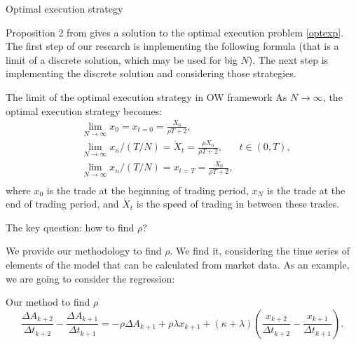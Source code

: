 \documentclass[]{beamer}
\begin{document}
\begin{frame}[t]
\begin{columns}[t]
\begin{column}{\onecolwid}
    \begin{block}{Optimal execution strategy }
    
    Proposition 2 from \cite{obizhaeva2013optimal} gives a solution to the optimal execution problem 
    \eqref{optexp}. The first step of our research is implementing the following formula (that is a 
    limit of a discrete solution, which may be used for big $N$). 
    The next step is implementing the discrete solution and considering those 
    strategies.
    
    \begin{alertblock}{The limit of the optimal execution strategy in OW framework}
        As $N \rightarrow \infty$, the optimal execution strategy becomes:
        \begin{align*}
            & \lim _{N \rightarrow \infty} x_0 = x_{t = 0} = \frac{X_0}{\rho T + 2}, \\
            & \lim _{N \rightarrow \infty} x_n / (T/N) = \dot X _t = \frac{\rho X_0}{\rho T + 2}, \;\;\;\;\;\; t \in (0, T), \\
            & \lim _{N \rightarrow \infty} x_n / (T/N) = x_{t=T}=  \frac{X_0}{\rho T + 2},  \\
        \end{align*}
        where $x_0$ is the trade at the beginning of trading period, $x_N$ is the trade at the end of trading
        period, and $\dot X _t$ is the speed of trading in between these trades.
    \end{alertblock}
    \end{block}

    \begin{block}{The key question: how to find $\rho$?}
        
        We provide our methodology to find $\rho$. We find it, considering the time series of elements of the model 
        that can be calculated from market data. As an example, we are going to consider the regression:
        \begin{alertblock}{Our method to find $\rho$}
            \begin{equation*}
                \frac{\Delta A_{k+2}}{\Delta t_{k+2}} - \frac{\Delta A_{k+1}}{\Delta t_{k+1}} 
        = - \rho \Delta A_{k+1} + \rho \lambda x_{k+1} + (\kappa + \lambda) (\frac{x_{k+2}}{\Delta t_{k+2}} - \frac{x_{k+1}}{\Delta t_{k+1}}).
            \end{equation*}
        \end{alertblock}


\end{block}
\end{column}
\end{columns}
\end{frame}
\end{document}
